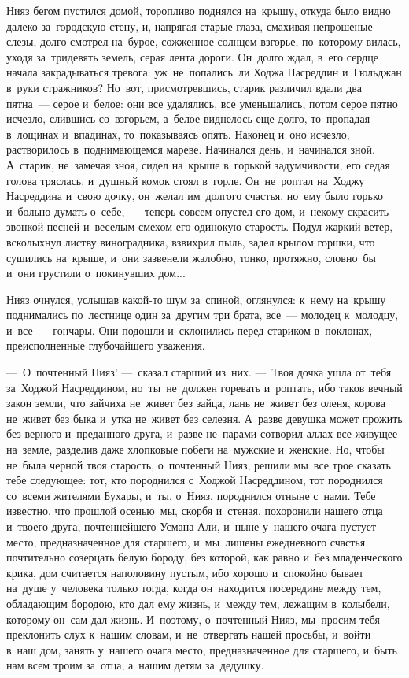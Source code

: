 \documentclass[12pt,a4paper]{book}
\begin{document}
Нияз бегом пустился домой, торопливо поднялся на~крышу, откуда было видно далеко за~городскую стену, и, напрягая старые глаза, смахивая непрошеные слезы, долго смотрел на~бурое, сожженное солнцем взгорье, по~которому вилась, уходя за~тридевять земель, серая лента дороги. Он~долго ждал, в~его сердце начала закрадываться тревога: уж~не~попались~ли Ходжа Насреддин и~Гюльджан в~руки стражников? Но~вот, присмотревшись, старик различил вдали два пятна~— серое и~белое: они все удалялись, все уменьшались, потом серое пятно исчезло, слившись со~взгорьем, а~белое виднелось еще долго, то~пропадая в~лощинах и~впадинах, то~показываясь опять. Наконец и~оно исчезло, растворилось в~поднимающемся мареве. Начинался день, и~начинался зной. А~старик, не~замечая зноя, сидел на~крыше в~горькой задумчивости, его седая голова тряслась, и~душный комок стоял в~горле. Он~не~роптал на~Ходжу Насреддина и~свою дочку, он~желал им~долгого счастья, но~ему было горько и~больно думать о~себе,~— теперь совсем опустел его дом, и~некому скрасить звонкой песней и~веселым смехом его одинокую старость. Подул жаркий ветер, всколыхнул листву виноградника, взвихрил пыль, задел крылом горшки, что сушились на~крыше, и~они зазвенели жалобно, тонко, протяжно, словно~бы и~они грустили о~покинувших дом...

Нияз очнулся, услышав какой-то шум за~спиной, оглянулся: к~нему на~крышу поднимались по~лестнице один за~другим три брата, все~— молодец к~молодцу, и~все~— гончары. Они подошли и~склонились перед стариком в~поклонах, преисполненные глубочайшего уважения.

—~О~почтенный Нияз! —~сказал старший из~них. —~Твоя дочка ушла от~тебя за~Ходжой Насреддином, но~ты~не~должен горевать и~роптать, ибо таков вечный закон земли, что зайчиха не~живет без зайца, лань не~живет без оленя, корова не~живет без быка и~утка не~живет без селезня. А~разве девушка может прожить без верного и~преданного друга, и~разве не~парами сотворил аллах все живущее на~земле, разделив даже хлопковые побеги на~мужские и~женские. Но, чтобы не~была черной твоя старость, о~почтенный Нияз, решили мы~все трое сказать тебе следующее: тот, кто породнился с~Ходжой Насреддином, тот породнился со~всеми жителями Бухары, и~ты, о~Нияз, породнился отныне с~нами. Тебе известно, что прошлой осенью~мы, скорбя и~стеная, похоронили нашего отца и~твоего друга, почтеннейшего Усмана Али, и~ныне у~нашего очага пустует место, предназначенное для старшего, и~мы~лишены ежедневного счастья почтительно созерцать белую бороду, без которой, как равно и~без младенческого крика, дом считается наполовину пустым, ибо хорошо и~спокойно бывает на~душе у~человека только тогда, когда он~находится посередине между тем, обладающим бородою, кто дал ему жизнь, и~между тем, лежащим в~колыбели, которому он~сам дал жизнь. И~поэтому, о~почтенный Нияз, мы~просим тебя преклонить слух к~нашим словам, и~не~отвергать нашей просьбы, и~войти в~наш дом, занять у~нашего очага место, предназначенное для старшего, и~быть нам всем троим за~отца, а~нашим детям за~дедушку.
\end{document}
